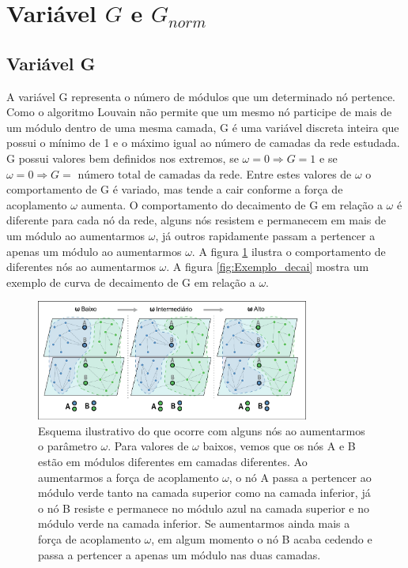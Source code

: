 \documentclass[
  12pt,
]{article}
\begin{document}
\clearpage

\hypertarget{variuxe1vel-g-e-g_norm}{%
\section{\texorpdfstring{Variável \(G\) e
\(G_{norm}\)}{Variável G e G\_\{norm\}}}\label{variuxe1vel-g-e-g_norm}}

\hypertarget{variuxe1vel-g}{%
\subsection{Variável G}\label{variuxe1vel-g}}

A variável G representa o número de módulos que um determinado nó
pertence. Como o algoritmo Louvain não permite que um mesmo nó participe
de mais de um módulo dentro de uma mesma camada, G é uma variável
discreta inteira que possui o mínimo de 1 e o máximo igual ao número de
camadas da rede estudada. G possui valores bem definidos nos extremos,
se \(\omega = 0 \Rightarrow G = 1\) e se
\(\omega = 0 \Rightarrow G = \text{ número total de camadas da rede}\).
Entre estes valores de \(\omega\) o comportamento de G é variado, mas
tende a cair conforme a força de acoplamento \(\omega\) aumenta. O
comportamento do decaimento de G em relação a \(\omega\) é diferente
para cada nó da rede, alguns nós resistem e permanecem em mais de um
módulo ao aumentarmos \(\omega\), já outros rapidamente passam a
pertencer a apenas um módulo ao aumentarmos \(\omega\). A figura
\ref{fig:Figura_G} ilustra o comportamento de diferentes nós ao
aumentarmos \(\omega\). A figura \ref{fig:Exemplo_decai} mostra um
exemplo de curva de decaimento de G em relação a \(\omega\).

\begin{figure}[H] 
\centering
\includegraphics[width=0.8\textwidth]{./Figuras/Figura_G.png}
\caption{Esquema ilustrativo do que ocorre com alguns nós ao aumentarmos o parâmetro $\omega$. Para valores de $\omega$ baixos, vemos que os nós A e B estão em módulos diferentes em camadas diferentes. Ao aumentarmos a força de acoplamento $\omega$, o nó A passa a pertencer ao módulo verde tanto na camada superior como na camada inferior, já o nó B resiste e permanece no módulo azul na camada superior e no módulo verde na camada inferior. Se aumentarmos ainda mais a força de acoplamento $\omega$, em algum momento o nó B acaba cedendo e passa a pertencer a apenas um módulo nas duas camadas.}
\label{fig:Figura_G}
\end{figure}
\end{document}
